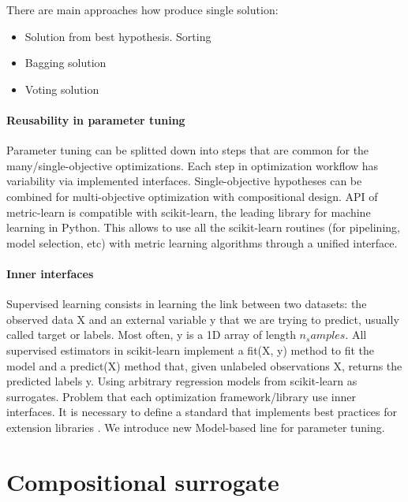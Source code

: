 There are main approaches how produce single solution: 
\begin{itemize}
    \item Solution from best hypothesis. Sorting
    \item Bagging solution
    \item Voting solution                
\end{itemize}


\paragraph{Reusability in parameter tuning} Parameter tuning can be splitted down into steps that are common for the many/single-objective optimizations. Each step in optimization workflow has variability via implemented interfaces. Single-objective hypotheses can be combined for multi-objective optimization with compositional design. API of metric-learn is compatible with scikit-learn, the leading library for machine learning in Python. This allows to use all the scikit-learn routines (for pipelining, model selection, etc) with metric learning algorithms through a unified interface.


\paragraph{Inner interfaces} Supervised learning consists in learning the link between two datasets: the observed data X and an external variable y that we are trying to predict, usually called target or labels. Most often, y is a 1D array of length $n_samples$. All supervised estimators in scikit-learn implement a fit(X, y) method to fit the model and a predict(X) method that, given unlabeled observations X, returns the predicted labels y. Using arbitrary regression models from scikit-learn as surrogates. Problem that each optimization framework/library use inner interfaces. It is necessary to define a standard that implements best practices for extension libraries \cite{buitinck2013api}. We introduce new Model-based line for parameter tuning. 

\section{Compositional surrogate}

